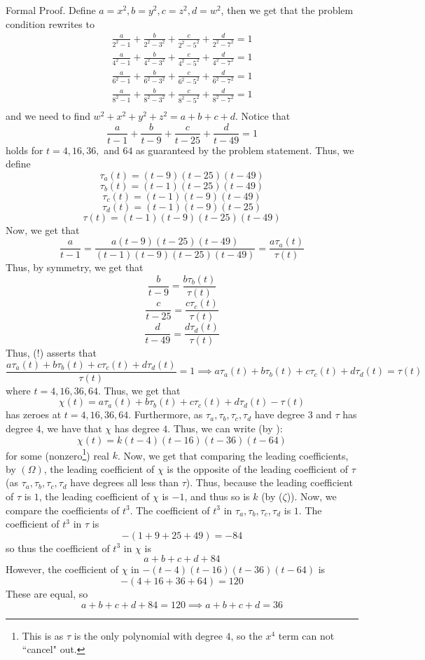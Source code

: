 \documentclass[11pt,titlepage]{scrartcl}
\begin{document}
\begin{induction_snippet}{Formal Proof.}
Define $a=x^2,b=y^2,c=z^2,d=w^2$, then we get that the problem condition rewrites to
\[ \begin{array}{l} \displaystyle \frac{a}{2^2-1}+\frac{b}{2^2-3^2}+\frac{c}{2^2-5^2}+\frac{d}{2^2-7^2}=1 \\ \displaystyle \frac{a}{4^2-1}+\frac{b}{4^2-3^2}+\frac{c}{4^2-5^2}+\frac{d}{4^2-7^2}=1 \\ \displaystyle \frac{a}{6^2-1}+\frac{b}{6^2-3^2}+\frac{c}{6^2-5^2}+\frac{d}{6^2-7^2}=1 \\ \displaystyle \frac{a}{8^2-1}+\frac{b}{8^2-3^2}+\frac{c}{8^2-5^2}+\frac{d}{8^2-7^2}=1 \\ \end{array}  \]
and we need to find $w^2+x^2+y^2+z^2=a+b+c+d$. Notice that
\[\dfrac{a}{t-1}+\dfrac{b}{t-9}+\dfrac{c}{t-25}+\dfrac{d}{t-49}=1\tag{!}\]
holds for $t=4,16,36,$ and $64$ as guaranteed by the problem statement. Thus, we define
\[\tau_a(t)=(t-9)(t-25)(t-49)\]
\[\tau_b(t)=(t-1)(t-25)(t-49)\]
\[\tau_c(t)=(t-1)(t-9)(t-49)\]
\[\tau_d(t)=(t-1)(t-9)(t-25)\]
\[\tau(t)=(t-1)(t-9)(t-25)(t-49)\]
Now, we get that
\[\dfrac{a}{t-1}=\dfrac{a(t-9)(t-25)(t-49)}{(t-1)(t-9)(t-25)(t-49)}=\dfrac{a\tau_a(t)}{\tau(t)}\]
Thus, by symmetry, we get that
\[\dfrac{b}{t-9}=\dfrac{b\tau_b(t)}{\tau(t)}\]
\[\dfrac{c}{t-25}=\dfrac{c\tau_c(t)}{\tau(t)}\]
\[\dfrac{d}{t-49}=\dfrac{d\tau_d(t)}{\tau(t)}\]
Thus, (!) asserts that
\[\dfrac{a\tau_a(t)+b\tau_b(t)+c\tau_c(t)+d\tau_d(t)}{\tau(t)}=1\implies a\tau_a(t)+b\tau_b(t)+c\tau_c(t)+d\tau_d(t)=\tau(t)\]
where $t=4,16,36,64$. Thus, we get that
\[\chi(t)=a\tau_a(t)+b\tau_b(t)+c\tau_c(t)+d\tau_d(t)-\tau(t)\tag{$\Omega$}\]
has zeroes at $t=4,16,36,64$. Furthermore, as $\tau_a,\tau_b,\tau_c,\tau_d$ have degree $3$ and $\tau$ has degree $4$, we have that $\chi$ has degree $4$. Thus, we can write (by ):
\[\chi(t)=k(t-4)(t-16)(t-36)(t-64)\tag{$\zeta$}\]
for some (nonzero\footnote{This is as $\tau$ is the only polynomial with degree $4$, so the $x^4$ term can not ``cancel" out.}) real $k$. Now, we get that comparing the leading coefficients, by $(\Omega)$, the leading coefficient of $\chi$ is the opposite of the leading coefficient of $\tau$ (as $\tau_a,\tau_b,\tau_c,\tau_d$ have degrees all less than $\tau$). Thus, because the leading coefficient of $\tau$ is $1$, the leading coefficient of $\chi$ is $-1$, and thus so is $k$ (by ($\zeta$)). Now, we compare the coefficients of $t^3$. The coefficient of $t^3$ in $\tau_a,\tau_b,\tau_c,\tau_d$ is $1$. The coefficient of $t^3$ in $\tau$ is
\[-(1+9+25+49)=-84\]
so thus the coefficient of $t^3$ in $\chi$ is
\[a+b+c+d+84\]
However, the coefficient of $\chi$ in $-(t-4)(t-16)(t-36)(t-64)$ is 
\[-(4+16+36+64)=120\]
These are equal, so 
\[a+b+c+d+84=120\implies a+b+c+d=\boxed{36}\]
\end{induction_snippet}
\end{document}
